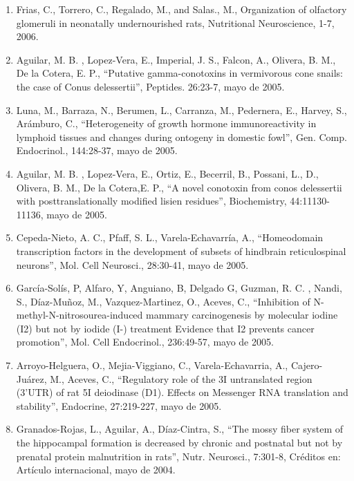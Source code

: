 \begin{enumerate}
\item Frias, C., Torrero, C., Regalado, M., and Salas., M., Organization of olfactory glomeruli in neonatally undernourished rats, 
Nutritional 
Neuroscience, 1-7, 2006.

\item Aguilar, M. B. , Lopez-Vera, E., Imperial, J. S., Falcon, A., Olivera, B. M., De la Cotera, E. P., “Putative gamma-conotoxins in 
vermivorous 
cone snails: the case of Conus delessertii”, Peptides. 26:23-7, mayo de 2005.

\item Luna, M., Barraza, N., Berumen, L., Carranza, M., Pedernera, E., Harvey, S., Arámburo, C., “Heterogeneity of growth hormone 
immunoreactivity 
in lymphoid tissues and changes during ontogeny in domestic fowl”, Gen. Comp. Endocrinol., 144:28-37, mayo de 2005.

\item Aguilar, M. B. , Lopez-Vera, E., Ortiz, E., Becerril, B., Possani, L., D., Olivera, B. M., De la Cotera,E. P., “A novel conotoxin from 
conos 
delessertii with posttranslationally modified lisien residues”, Biochemistry, 44:11130-11136, mayo de 2005.

\item Cepeda-Nieto, A. C., Pfaff, S. L., Varela-Echavarría, A., “Homeodomain transcription factors in the development of subsets of hindbrain 
reticulospinal neurons”, Mol. Cell Neurosci., 28:30-41, mayo de 2005.

\item García-Solís, P, Alfaro, Y, Anguiano, B, Delgado G, Guzman, R. C. , Nandi, S., Díaz-Muñoz, M., Vazquez-Martinez, O., Aceves, C., 
“Inhibition 
of N-methyl-N-nitrosourea-induced mammary carcinogenesis by molecular iodine (I2) but not by iodide (I-) treatment Evidence that I2 prevents 
cancer promotion”, Mol. Cell Endocrinol., 236:49-57, mayo de 2005.

\item Arroyo-Helguera, O., Mejia-Viggiano, C., Varela-Echavarria, A., Cajero-Juárez, M., Aceves, C., “Regulatory role of the 3I untranslated 
region 
(3’UTR) of rat 5I deiodinase (D1). Effects on Messenger RNA translation and stability”, Endocrine, 27:219-227, mayo de 2005.

\item Granados-Rojas, L., Aguilar, A., Díaz-Cintra, S., “The mossy fiber system of the hippocampal formation is decreased by chronic and 
postnatal 
but not by prenatal protein malnutrition in rats”, Nutr. Neurosci., 7:301-8, Créditos en: Artículo internacional, mayo de 2004.


\end{enumerate}

